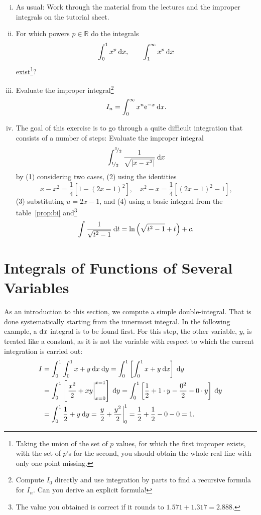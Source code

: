 \begin{exercise}
\begin{enumerate}[(i)]
	\item As usual: Work through the material from the lectures and the improper integrals on the tutorial sheet.
	\item For which powers $p\in\mathbb{R}$ do the integrals
		\[ \int_{0}^{1} x^p \: \mathrm{d} x, \qquad \int_{1}^{\infty} x^p \: \mathrm{d} x \]
	exist\footnote{Taking the union of the set of $p$ values, for which the first improper exists, with the set of $p$'s for the second, you should obtain the whole real line with only one point missing.}?		
	\item Evaluate the improper integral\footnote{Compute $I_0$ directly and use integration by parts to find a recursive formula for $I_n$. Can you derive an explicit formula!}
		\[ I_n = \int_{0}^{\infty} x^n\mathrm{e}^{-x} \: \mathrm{d} x. \]
	\item The goal of this exercise is to go through a quite difficult integration that consists of a number of steps: Evaluate the improper integral
		\[ \int_{{}^{1}\!/_{2}}^{{}^{3}\!/_{2}} \frac{1}{\sqrt{\left| x-x^2 \right|}} \: \mathrm{d} x \]
	by (1) considering two cases, (2) using the identities
	\[ x-x^2 = \frac14\left[ 1-(2x-1)^2 \right], 
	\quad x^2-x = \frac14\left[ (2x-1)^2-1 \right], \]
	(3) substituting $u=2x-1$, and (4) using a basic integral from the table~\ref{prop:bi} and\footnote{The value you obtained is correct if it rounds to $1.571+1.317=2.888$.}
	\[ \int_{}^{} \frac{1}{\sqrt{t^2-1}} \: \mathrm{d} t =\ln \left( \sqrt{t^2-1}+t \right)+c.\]
\end{enumerate}		
\end{exercise}


\section{Integrals of Functions of Several Variables}

\begin{example}
\label{expl:first_higher-dim_int}
As an introduction to this section, we compute a simple double-integral. That is done systematically starting from the innermost integral. In the following example, a $\mathrm{d} x$ integral is to be found first. For this step, the other variable, $y$, is treated like a constant, as it is not the variable with respect to which the current integration is carried out:
\begin{equation*}
\begin{split}
I & = \int_{0}^{1} \int_{0}^{1} x+y \: \mathrm{d} x \: \mathrm{d} y 
= \int_{0}^{1} \left[\int_{0}^{1} x+y \: \mathrm{d} x\right] \: \mathrm{d} y \\
& = \int_{0}^{1} \left[ \left. \frac{x^2}{2} + xy \right|_{x=0}^{x=1} \right] \: \mathrm{d} y 
= \int_{0}^{1} \left[ \frac{1}{2} + 1 \cdot y - \frac{0^2}{2} - 0 \cdot y \right] \: \mathrm{d} y \\
& = \int_{0}^{1} \frac12+y \: \mathrm{d} y = \left. \frac{y}{2} + \frac{y^2}{2} \right|_0^1 
= \frac12 + \frac 12 - 0 - 0 = 1.
\end{split}
\end{equation*}
\end{example}

